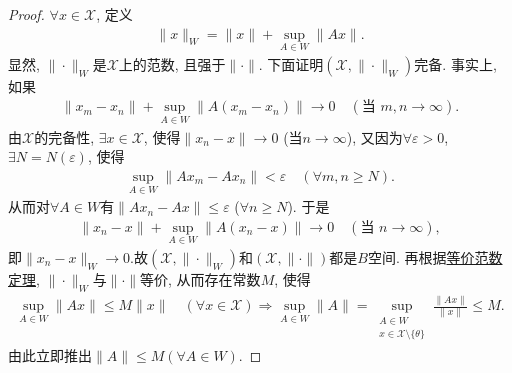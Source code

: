 \documentclass[../../main.tex]{subfiles}%
\begin{document}
\begin{proof}

$\forall x\in\mathscr{X}$, 定义
\begin{align*}
\|x\|_W = \|x\| + \sup_{A\in W}\|Ax\|.
\end{align*}
显然, $\|\cdot\|_W$是$\mathscr{X}$上的范数, 且强于$\|\cdot\|$. 下面证明$(\mathscr{X},\|\cdot\|_W)$完备. 事实上, 如果
\begin{align*}
\|x_m - x_n\| + \sup_{A\in W}\|A(x_m - x_n)\| \to 0 \quad (\text{当 }m,n\to\infty).
\end{align*}
由$\mathscr{X}$的完备性, $\exists x\in\mathscr{X}$, 使得$\|x_n - x\|\to 0$ (当$n\to\infty$), 又因为$\forall\varepsilon>0$, $\exists N=N(\varepsilon)$, 使得
\begin{align*}
\sup_{A\in W}\|Ax_m - Ax_n\| < \varepsilon \quad (\forall m,n\geqslant N).
\end{align*}
从而对$\forall A\in W$有$\|Ax_n - Ax\|\leqslant\varepsilon$ ($\forall n\geqslant N$). 于是
\begin{align*}
\|x_n - x\| + \sup_{A\in W}\|A(x_n - x)\| \to 0 \quad (\text{当 }n\to\infty),
\end{align*}
即$\|x_n - x\|_W\to 0$.故$(\mathscr{X},\|\cdot\|_W)$和$(\mathscr{X},\|\cdot\|)$都是$B$空间. 再根据\hyperref[corollary:泛函分析--等价范数定理]{等价范数定理}, $\|\cdot\|_W$与$\|\cdot\|$等价, 从而存在常数$M$, 使得
\begin{align*}
\sup\limits_{A\in W}\|Ax\| \leqslant M\|x\| \quad (\forall x\in \mathscr{X}) \Longrightarrow \sup\limits_{A\in W}\|A\| = \sup\limits_{\substack{A\in W\\ x\in \mathscr{X} \setminus \{ \theta \}}}\frac{\|Ax\|}{\|x\|} \leqslant M.
\end{align*}
由此立即推出$\|A\|\leqslant M(\forall A\in W)$.

\end{proof}
\end{document}
